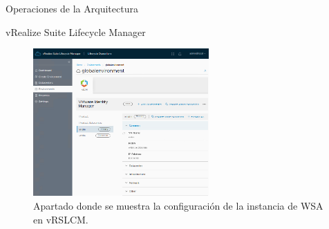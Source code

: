 \begin{subsection}{Operaciones de la Arquitectura}
\begin{subsubsection}{vRealize Suite Lifecycle Manager}
        \begin{figure}[h]
            \centering
            \includegraphics[width=0.6\textwidth]{imaxes/pruebaconcepto/vrealize/config-istance-vridm.png}
            \caption{Apartado donde se muestra la configuración de la instancia de WSA en vRSLCM.}
            \label{fig:config-WSA}
        \end{figure}
        \FloatBarrier
        


        
    \end{subsubsection}


\end{subsection}
